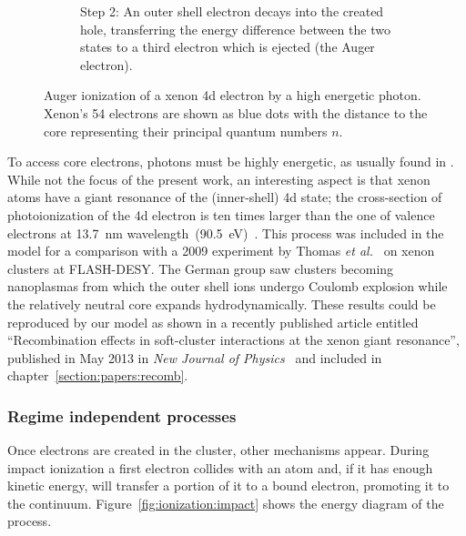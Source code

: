 \begin{figure}
\begin{subfigure}[t]{0.45\columnwidth}
        \caption{Step 2: An outer shell electron decays into the created hole,
                 transferring the energy difference between the two states to a
                 third electron which is ejected (the Auger electron).}
        \label{fig:auger:2}
    \end{subfigure}
        \caption{\label{fig:auger}Auger ionization of a xenon 4d electron by a
                 high energetic \xray photon. Xenon's 54 electrons are shown
                 as blue dots with the distance to the core representing their
                 principal quantum numbers $n$.}
\end{figure}

To access core electrons, photons must be highly energetic, as usually found in \xraysp.
While not the focus of the present work, an interesting aspect is that xenon
atoms have a giant resonance of the (inner-shell) 4d state; the cross-section of
photoionization of the 4d electron is ten times larger than the
one of valence  electrons at 13.7~nm wavelength~(90.5~eV)~\cite{Becker1986}.
This process was included in the model for a comparison with a 2009 experiment
by Thomas \textit{et al.}~\cite{Thomas2009} on xenon clusters at FLASH-DESY.
The German group saw clusters becoming nanoplasmas from which the outer shell
ions undergo Coulomb explosion while the relatively neutral core expands
hydrodynamically. These results could be reproduced by our model as shown in a recently
published article entitled ``Recombination effects in soft-\xray cluster
interactions at the xenon giant resonance'', published in May 2013 in
\textit{New Journal of Physics}~\cite{Ackad2013} and included in
chapter~\ref{section:papers:recomb}.

\subsubsection{Regime independent processes}
\label{section:intro:mechanisms:noregime}

Once electrons are created in the cluster, other mechanisms appear. During
impact ionization a first electron collides with an atom and, if it has enough
kinetic energy, will transfer a portion of it to a bound electron, promoting it
to the continuum. Figure~\ref{fig:ionization:impact} shows the energy diagram
of the process.

